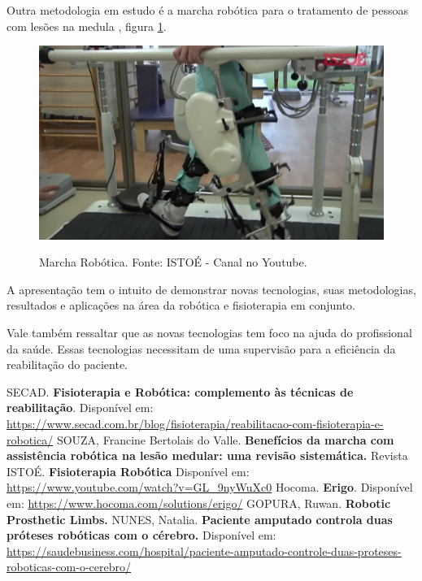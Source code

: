\documentclass[12pt,a4paper]{article}
\begin{document}
    \par Outra metodologia em estudo é a marcha robótica para o tratamento de pessoas com lesões na medula \cite{1} \cite{3}, figura \ref{fig:marcha}.


    \begin{figure}[ht]
        \caption{Marcha Robótica. Fonte: ISTOÉ - Canal no Youtube. \cite{3}}
        \centering
        \includegraphics[width=0.6\linewidth]
        {images/marcha.png}
        \label{fig:marcha}
    \end{figure}
    

    \par A apresentação tem o intuito de demonstrar novas tecnologias, suas metodologias, resultados e aplicações na área da robótica e fisioterapia em conjunto.
    \par Vale também ressaltar que as novas tecnologias tem foco na ajuda do profissional da saúde. Essas tecnologias necessitam de uma supervisão para a eficiência da reabilitação do paciente.
    \newpage
    \newpage
    \begin{thebibliography}{BIBLIOGRAFIA}
 
         SECAD. \textbf{Fisioterapia e Robótica: complemento às técnicas de reabilitação}. Disponível em: \url{https://www.secad.com.br/blog/fisioterapia/reabilitacao-com-fisioterapia-e-robotica/}
         SOUZA, Francine Bertolais do Valle. \textbf{Benefícios da marcha com assistência robótica na lesão medular: uma revisão sistemática.}
         Revista ISTOÉ. \textbf{Fisioterapia Robótica} Disponível em: \url{https://www.youtube.com/watch?v=GL_9nyWuXc0}
         Hocoma. \textbf{Erigo}. Disponível em: \url{https://www.hocoma.com/solutions/erigo/}
         GOPURA, Ruwan. \textbf{Robotic Prosthetic Limbs.}
         NUNES, Natalia. \textbf{Paciente amputado controla duas próteses robóticas com o cérebro.} Disponível em: \url{https://saudebusiness.com/hospital/paciente-amputado-controle-duas-proteses-roboticas-com-o-cerebro/}
    \end{thebibliography}
\end{document}
